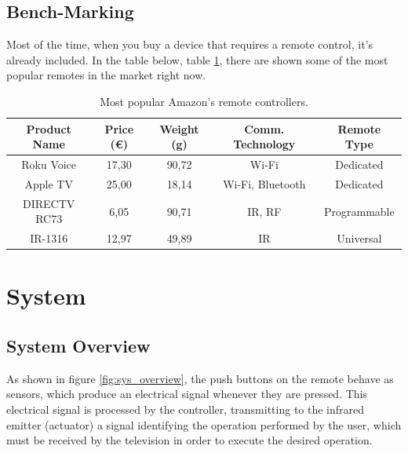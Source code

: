 \documentclass[12pt, letterpaper]{report}
\begin{document}
%
%
%


\subsection{Bench-Marking}
Most of the time, when you buy a device that requires a remote control, it's already included. In the table below, table \ref{table:popular_remotes}, there are shown some of the most popular remotes in the market right now.

\begin{table}[h]
	\centering
	\begin{tabular}{||c c c c c||} 
	\hline
	Product Name & Price (€) & Weight (g) & Comm. Technology & Remote Type\\
	\hline\hline
	Roku Voice & 17,30 & 90,72 & Wi-Fi & Dedicated\\ 
	Apple TV & 25,00 & 18,14 & Wi-Fi, Bluetooth & Dedicated \\
	DIRECTV RC73 & 6,05 & 90,71 & IR, RF & Programmable\\
	IR-1316 & 12,97 & 49,89 & IR & Universal\\
	\hline
\end{tabular}
				
\caption{Most popular Amazon's remote controllers. }
\label{table:popular_remotes}
\end{table}
		
\section{System}
\subsection{System Overview}
As shown in figure \ref{fig:sys_overview}, the push buttons on the remote behave as sensors, which produce an electrical signal whenever they are pressed. This electrical signal is processed by the controller, transmitting to the infrared emitter (actuator) a signal identifying the operation performed by the user, which must be received by the television in order to execute the desired operation.
\end{document}
